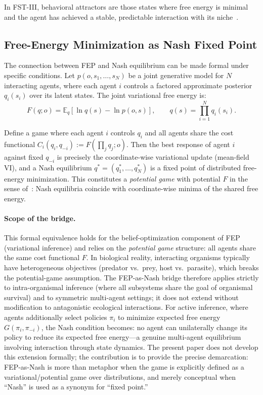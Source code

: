 \documentclass[12pt,a4paper]{article}
\theoremstyle{remark}
\begin{document}
In FST-III, behavioral attractors are those states where free energy is minimal and the agent has achieved a stable, predictable interaction with its niche~\citep{FristonFreeEnergy}.

\subsection{Free-Energy Minimization as Nash Fixed Point}

The connection between FEP and Nash equilibrium can be made formal under specific conditions. Let $p(o,s_1,\dots,s_N)$ be a joint generative model for $N$ interacting agents, where each agent $i$ controls a factored approximate posterior $q_i(s_i)$ over its latent states. The joint variational free energy is:
\begin{equation}
F(q; o) = \mathbb{E}_q\!\left[\ln q(s) - \ln p(o, s)\right], \qquad q(s) = \prod_{i=1}^{N} q_i(s_i).
\end{equation}

Define a game where each agent $i$ controls $q_i$ and all agents share the cost functional $C_i(q_i, q_{-i}) := F(\prod_j q_j; o)$. Then the best response of agent $i$ against fixed $q_{-i}$ is precisely the coordinate-wise variational update (mean-field VI), and a Nash equilibrium $q^* = (q_1^*, \dots, q_N^*)$ is a fixed point of distributed free-energy minimization. This constitutes a \emph{potential game} with potential $F$ in the sense of~\citet{MondererShapley1996}: Nash equilibria coincide with coordinate-wise minima of the shared free energy.

\paragraph{Scope of the bridge.} This formal equivalence holds for the belief-optimization component of FEP (variational inference) and relies on the \emph{potential game} structure: all agents share the same cost functional $F$. In biological reality, interacting organisms typically have heterogeneous objectives (predator vs.\ prey, host vs.\ parasite), which breaks the potential-game assumption. The FEP-as-Nash bridge therefore applies strictly to intra-organismal inference (where all subsystems share the goal of organismal survival) and to symmetric multi-agent settings; it does not extend without modification to antagonistic ecological interactions. For active inference, where agents additionally select policies $\pi_i$ to minimize expected free energy $G(\pi_i, \pi_{-i})$, the Nash condition becomes: no agent can unilaterally change its policy to reduce its expected free energy---a genuine multi-agent equilibrium involving interaction through state dynamics. The present paper does not develop this extension formally; the contribution is to provide the precise demarcation: FEP-as-Nash is more than metaphor when the game is explicitly defined as a variational/potential game over distributions, and merely conceptual when ``Nash'' is used as a synonym for ``fixed point.''
\end{document}
